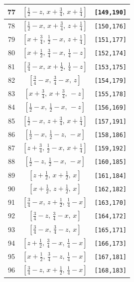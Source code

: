 \documentclass[fleqn,8pt]{jsarticle}
\begin{document}
\begin{longtable}{ccc}
77 & $\left[ \frac{1}{2} - z,\, x + \frac{3}{4},\, x + \frac{1}{4} \right]$ & {\tt [149,190]} \\ \hline
78 & $\left[ \frac{1}{2} - x,\, x + \frac{3}{4},\, z + \frac{1}{4} \right]$ & {\tt [150,176]} \\ \hline
79 & $\left[ x + \frac{3}{4},\, \frac{1}{2} - x,\, z + \frac{1}{4} \right]$ & {\tt [151,177]} \\ \hline
80 & $\left[ x + \frac{1}{2},\, \frac{3}{4} - x,\, \frac{1}{4} - z \right]$ & {\tt [152,174]} \\ \hline
81 & $\left[ \frac{3}{4} - x,\, x + \frac{1}{2},\, \frac{1}{4} - z \right]$ & {\tt [153,175]} \\ \hline
82 & $\left[ \frac{3}{4} - x,\, \frac{3}{4} - x,\, z \right]$ & {\tt [154,179]} \\ \hline
83 & $\left[ x + \frac{3}{4},\, x + \frac{3}{4},\, - z \right]$ & {\tt [155,178]} \\ \hline
84 & $\left[ \frac{1}{2} - x,\, \frac{1}{2} - x,\, - z \right]$ & {\tt [156,169]} \\ \hline
85 & $\left[ \frac{1}{2} - x,\, z + \frac{3}{4},\, x + \frac{1}{4} \right]$ & {\tt [157,191]} \\ \hline
86 & $\left[ \frac{1}{2} - x,\, \frac{1}{2} - z,\, - x \right]$ & {\tt [158,186]} \\ \hline
87 & $\left[ z + \frac{3}{4},\, \frac{1}{2} - x,\, x + \frac{1}{4} \right]$ & {\tt [159,192]} \\ \hline
88 & $\left[ \frac{1}{2} - z,\, \frac{1}{2} - x,\, - x \right]$ & {\tt [160,185]} \\ \hline
89 & $\left[ z + \frac{1}{2},\, x + \frac{1}{2},\, x \right]$ & {\tt [161,184]} \\ \hline
90 & $\left[ x + \frac{1}{2},\, z + \frac{1}{2},\, x \right]$ & {\tt [162,182]} \\ \hline
91 & $\left[ \frac{3}{4} - x,\, z + \frac{1}{2},\, \frac{1}{4} - x \right]$ & {\tt [163,170]} \\ \hline
92 & $\left[ \frac{3}{4} - z,\, \frac{3}{4} - x,\, x \right]$ & {\tt [164,172]} \\ \hline
93 & $\left[ \frac{3}{4} - x,\, \frac{3}{4} - z,\, x \right]$ & {\tt [165,171]} \\ \hline
94 & $\left[ z + \frac{1}{2},\, \frac{3}{4} - x,\, \frac{1}{4} - x \right]$ & {\tt [166,173]} \\ \hline
95 & $\left[ x + \frac{1}{2},\, \frac{3}{4} - z,\, \frac{1}{4} - x \right]$ & {\tt [167,181]} \\ \hline
96 & $\left[ \frac{3}{4} - z,\, x + \frac{1}{2},\, \frac{1}{4} - x \right]$ & {\tt [168,183]} \\
\end{longtable}
\end{document}
